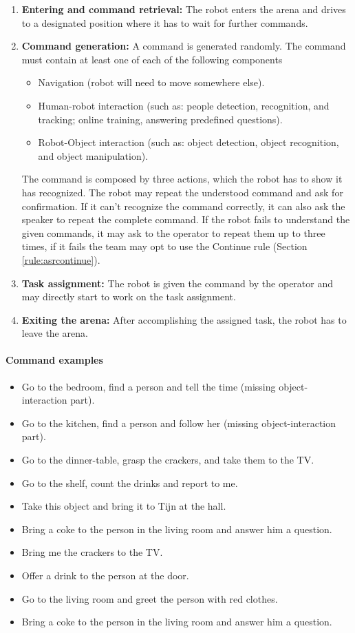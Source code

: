 \begin{enumerate}
\item \textbf{Entering and command retrieval:} The robot enters the arena and drives to a designated position where it has to wait for further commands.
\item \textbf{Command generation:} A command is generated randomly. The command must contain at least one of each of the following components
\begin{itemize}
\item Navigation (robot will need to move somewhere else).
\item Human-robot interaction (such as: people detection, recognition, and tracking; online training, answering predefined questions).
\item Robot-Object interaction (such as: object detection, object recognition, and object manipulation).
\end{itemize}
The command is composed by three actions, which the robot has to show it has recognized. The robot may repeat the understood command and ask for confirmation. If it can't recognize the command correctly, it can also ask the speaker to repeat the complete command. If the robot fails to understand the given commands, it may ask to the operator to repeat them up to three times, if it fails the team may opt to use the Continue rule (Section \ref{rule:asrcontinue}).
\item \textbf{Task assignment:} The robot is given the command by the operator and may directly start to work on the task assignment.
\item \textbf{Exiting the arena:} After accomplishing the assigned task, the robot has to leave the arena.
\end{enumerate}

\paragraph{Command examples}
\begin{itemize}
\item Go to the bedroom, find a person and tell the time (missing object-interaction part).
\item Go to the kitchen, find a person and follow her (missing object-interaction part).
\item Go to the dinner-table, grasp the crackers, and take them to the TV.
\item Go to the shelf, count the drinks and report to me.
\item Take this object and bring it to Tijn at the hall.
\item Bring a coke to the person in the living room and answer him a question.
\item Bring me the crackers to the TV.
\item Offer a drink to the person at the door.
\item Go to the living room and greet the person with red clothes.
\item Bring a coke to the person in the living room and answer him a question.
\end{itemize}

